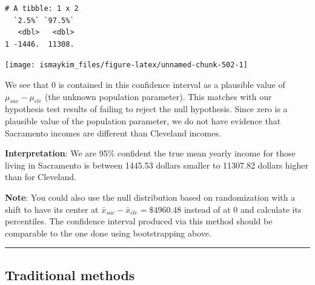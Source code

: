 \documentclass[12pt,]{krantz}
\makeatletter
\newenvironment{Shaded}{\begin{snugshade}}{\end{snugshade}}
\newcommand{\KeywordTok}[1]{\textcolor[rgb]{0.27,0.27,0.27}{\textbf{#1}}}
\newcommand{\DataTypeTok}[1]{\textcolor[rgb]{0.27,0.27,0.27}{#1}}
\newcommand{\StringTok}[1]{\textcolor[rgb]{0.5,0.5,0.5}{#1}}
\newcommand{\OperatorTok}[1]{\textcolor[rgb]{0.43,0.43,0.43}{\textbf{#1}}}
\newcommand{\NormalTok}[1]{#1}
\newenvironment{kframe}{%
\medskip{}
\setlength{\fboxsep}{.8em}
 \def\at@end@of@kframe{}%
 \ifinner\ifhmode%
  \def\at@end@of@kframe{\end{minipage}}%
  \begin{minipage}{\columnwidth}%
 \fi\fi%
 \def\FrameCommand##1{\hskip\@totalleftmargin \hskip-\fboxsep
 \colorbox{shadecolor}{##1}\hskip-\fboxsep
     \hskip-\linewidth \hskip-\@totalleftmargin \hskip\columnwidth}%
 \MakeFramed {\advance\hsize-\width
   \@totalleftmargin\z@ \linewidth\hsize
   \@setminipage}}%
 {\par\unskip\endMakeFramed%
 \at@end@of@kframe}
\renewenvironment{Shaded}{\begin{kframe}}{\end{kframe}}
\makeatother
\begin{document}
\begin{Shaded}
\end{Shaded}

\begin{verbatim}
# A tibble: 1 x 2
  `2.5%` `97.5%`
   <dbl>   <dbl>
1 -1446.  11308.
\end{verbatim}

\begin{Shaded}
\end{Shaded}

\begin{center}\texttt{[image: ismaykim\_files/figure-latex/unnamed-chunk-502-1]} \end{center}

We see that 0 is contained in this confidence interval as a plausible
value of \(\mu_{sac} - \mu_{cle}\) (the unknown population parameter).
This matches with our hypothesis test results of failing to reject the
null hypothesis. Since zero is a plausible value of the population
parameter, we do not have evidence that Sacramento incomes are different
than Cleveland incomes.

\textbf{Interpretation}: We are 95\% confident the true mean yearly
income for those living in Sacramento is between 1445.53 dollars smaller
to 11307.82 dollars higher than for Cleveland.

\textbf{Note}: You could also use the null distribution based on
randomization with a shift to have its center at
\(\bar{x}_{sac} - \bar{x}_{cle} = \$4960.48\) instead of at 0 and
calculate its percentiles. The confidence interval produced via this
method should be comparable to the one done using bootstrapping above.

\begin{center}\rule{0.5\linewidth}{\linethickness}\end{center}

\subsection{Traditional methods}\label{traditional-methods-3}
\end{document}
